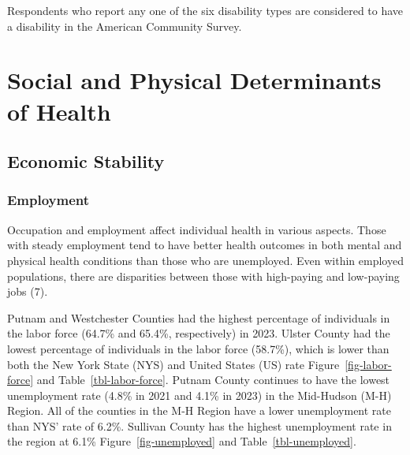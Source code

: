 \documentclass[
  english,
  letterpaper,
]{report}
\begin{document}
\begin{tcolorbox}[enhanced jigsaw, breakable, leftrule=.75mm, title=\textcolor{quarto-callout-note-color}{\faInfo}\hspace{0.5em}{Note}, bottomrule=.15mm, opacityback=0, left=2mm, colback=white, bottomtitle=1mm, coltitle=black, colbacktitle=quarto-callout-note-color!10!white, colframe=quarto-callout-note-color-frame, opacitybacktitle=0.6, toptitle=1mm, titlerule=0mm, arc=.35mm, rightrule=.15mm, toprule=.15mm]

Respondents who report any one of the six disability types are
considered to have a disability in the American Community Survey.

\end{tcolorbox}


\chapter{Social and Physical Determinants of
Health}\label{social-and-physical-determinants-of-health}

\section{Economic Stability}\label{economic-stability}

\subsection{Employment}\label{employment}

Occupation and employment affect individual health in various aspects.
Those with steady employment tend to have better health outcomes in both
mental and physical health conditions than those who are unemployed.
Even within employed populations, there are disparities between those
with high-paying and low-paying jobs (7).

Putnam and Westchester Counties had the highest percentage of
individuals in the labor force (64.7\% and 65.4\%, respectively) in
2023. Ulster County had the lowest percentage of individuals in the
labor force (58.7\%), which is lower than both the New York State (NYS)
and United States (US) rate Figure~\ref{fig-labor-force} and
Table~\ref{tbl-labor-force}. Putnam County continues to have the lowest
unemployment rate (4.8\% in 2021 and 4.1\% in 2023) in the Mid-Hudson
(M-H) Region. All of the counties in the M-H Region have a lower
unemployment rate than NYS' rate of 6.2\%. Sullivan County has the
highest unemployment rate in the region at 6.1\%
Figure~\ref{fig-unemployed} and Table~\ref{tbl-unemployed}.
\end{document}

